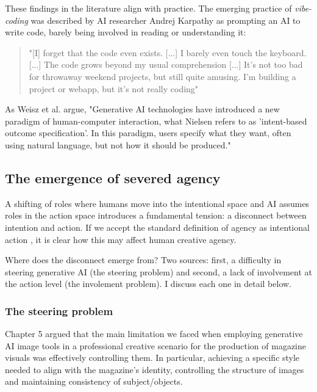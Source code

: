 These findings in the literature align with practice. The emerging practice of \textit{vibe-coding} was described by AI researcher Andrej Karpathy as prompting an AI to write code, barely being involved in reading or
understanding it:

\begin{quote}
"[I] forget that the code even exists. [...] I barely even touch the keyboard.
[...] The code grows beyond my usual comprehension [...] It’s not too bad for
throwaway weekend projects, but still quite amusing. I’m building a project
or webapp, but it’s not really coding"
\end{quote}



As Weisz et al. \cite{Weisz2024-io} argue, "Generative AI technologies have introduced a new paradigm of human-computer interaction, what Nielsen refers to as 'intent-based outcome specification'. In this paradigm, users specify what they want, often using natural language, but not how it should be produced."

\subsection{The emergence of severed agency}

A shifting of roles where humans move into the intentional space and AI assumes roles
in the action space introduces a fundamental tension: a disconnect between intention and
action. If we accept the standard definition of agency as intentional action \cite{Schlosser2019-jk}, it is clear how this may affect human creative agency.

Where does the disconnect emerge from? Two sources: first, a difficulty in steering generative AI (the steering problem) and second, a lack of involvement at the action level (the involement problem). I discuss each one in detail below. 

\subsubsection{The steering problem}

Chapter 5 argued that the main limitation we faced when employing generative AI image tools in a professional creative scenario for the production of magazine visuals was effectively controlling them. In particular, achieving a specific style needed to align with the magazine's identity, controlling the structure of images and maintaining consistency of subject/objects. 

